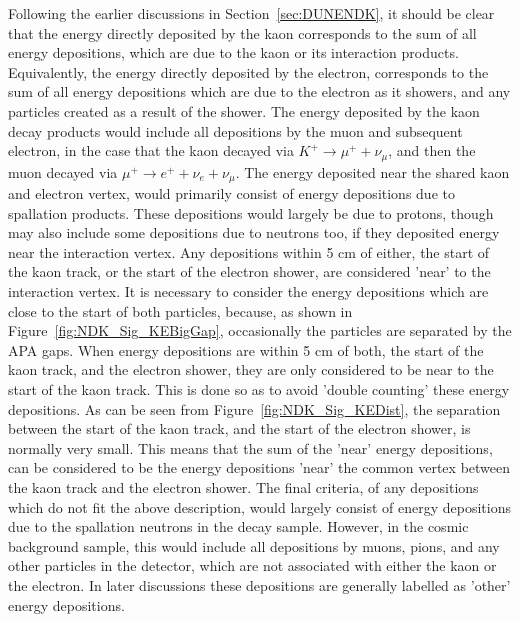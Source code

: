 Following the earlier discussions in Section~\ref{sec:DUNENDK}, it should be clear that the energy directly deposited by the kaon corresponds to the sum of all energy depositions, which are due to the kaon or its interaction products. Equivalently, the energy directly deposited by the electron, corresponds to the sum of all energy depositions which are due to the electron as it showers, and any particles created as a result of the shower. The energy deposited by the kaon decay products would include all depositions by the muon and subsequent electron, in the case that the kaon decayed via $K^{+} \rightarrow \mu^{+} + \nu_{\mu}$, and then the muon decayed via $\mu^{+} \rightarrow e^{+} + \nu_{e} + \nu_{\mu}$. The energy deposited near the shared kaon and electron vertex, would primarily consist of energy depositions due to spallation products. These depositions would largely be due to protons, though may also include some depositions due to neutrons too, if they deposited energy near the interaction vertex. Any depositions within 5 cm of either, the start of the kaon track, or the start of the electron shower, are considered 'near' to the interaction vertex. It is necessary to consider the energy depositions which are close to the start of both particles, because, as shown in Figure~\ref{fig:NDK_Sig_KEBigGap}, occasionally the particles are separated by the APA gaps. When energy depositions are within 5 cm of both, the start of the kaon track, and the electron shower, they are only considered to be near to the start of the kaon track. This is done so as to avoid 'double counting' these energy depositions. As can be seen from Figure~\ref{fig:NDK_Sig_KEDist}, the separation between the start of the kaon track, and the start of the electron shower, is normally very small. This means that the sum of the 'near' energy depositions, can be considered to be the energy depositions 'near' the common vertex between the kaon track and the electron shower. The final criteria, of any depositions which do not fit the above description, would largely consist of energy depositions due to the spallation neutrons in the decay sample. However, in the cosmic background sample, this would include all depositions by muons, pions, and any other particles in the detector, which are not associated with either the kaon or the electron. In later discussions these depositions are generally labelled as 'other' energy depositions. \\

